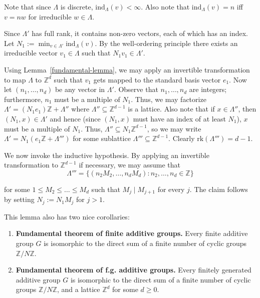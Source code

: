 \documentclass{template-2}
\begin{document}
Note that since $\Lambda$ is discrete, $\text{ind}_{\Lambda}(v) < \infty$. Also
note that $\text{ind}_{\Lambda}(v) = n$ iff $v=nw$ for irreducible $w \in \Lambda$.

Since $\Lambda'$ has full rank, it contains non-zero vectors, each of which has
an index. Let $N_1 := \min_{v \in \Lambda'} \text{ind}_{\Lambda}(v)$. By the
well-ordering principle there exists an irreducible vector $v_1 \in \Lambda$
such that $N_1v_1 \in \Lambda'$.

Using Lemma~\ref{fundamental-lemma}, we may apply an invertible transformation
to map $\Lambda$ to $\mathbb{Z}^d$ such that $v_1$ gets mapped to the standard
basis vector $e_1$. Now let $(n_1,\dots,n_d)$ be any vector in $\Lambda'$.
Observe that $n_1,\dots,n_d$ are integers; furthermore, $n_1$ must be a multiple
of $N_1$. Thus, we may factorize $\Lambda' = (N_1e_1)\mathbb{Z} + \Lambda''$
where $\Lambda'' \subseteq \mathbb{Z}^{d-1}$ is a lattice. Also note that if $x
\in \Lambda''$, then $(N_1,x) \in \Lambda'$ and hence (since $(N_1,x)$ must have
an index of at least $N_1$), $x$ must be a multiple of $N_1$. Thus, $\Lambda''
\subseteq N_1 \mathbb{Z}^{d-1}$, so we may write $\Lambda' =
N_1(e_1\mathbb{Z}+\Lambda''')$ for some sublattice $\Lambda''' \subseteq
\mathbb{Z}^{d-1}$. Clearly $\text{rk}(\Lambda''')=d-1$.

We now invoke the inductive hypothesis. By applying an invertible transformation
to $\mathbb{Z}^{d-1}$ if necessary, we may assume that
\begin{equation*}
    \Lambda''' = \{(n_2M_2,\dots,n_dM_d): n_2,\dots,n_d \in \mathbb{Z}\}
\end{equation*}

for some $1 \leq M_2 \leq \dots \leq M_d$ such that $M_j \mid M_{j+1}$ for every
$j$. The claim follows by setting $N_j := N_1M_j$ for $j>1$.

\begin{lemma}[Corollary]\label{smith-corollary}
    This lemma also has two nice corollaries:
    \begin{enumerate}
        \item[(a)] \textbf{Fundamental theorem of finite additive groups.} Every 
        finite additive group $G$ is isomorphic to the direct sum of a finite 
        number of cyclic groups $\mathbb{Z}/N\mathbb{Z}$.
        \item[(b)] \textbf{Fundamental theorem of f.g. additive groups.}
        Every finitely generated additive group $G$ is isomorphic to the direct 
        sum of a finite number of cyclic groups $\mathbb{Z}/N\mathbb{Z}$, and 
        a lattice $\mathbb{Z}^d$ for some $d \geq 0$.
    \end{enumerate}
\end{lemma}
\end{document}
